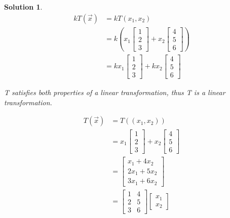 \documentclass{article}
\newtheorem*{solution}{Solution}
\begin{document}
\begin{solution}
\begin{align*}
kT(\vec{x}) &= kT(x_{1}, x_{2}) \\
&= k\left(x_{1} \begin{bmatrix} 1 \\ 2 \\ 3 \end{bmatrix} + x_{2} \begin{bmatrix} 4 \\ 5 \\ 6 \end{bmatrix} \right) \\
&= kx_{1} \begin{bmatrix} 1 \\ 2 \\ 3 \end{bmatrix} + kx_{2} \begin{bmatrix} 4 \\ 5 \\ 6 \end{bmatrix} 
\end{align*}

T satisfies both properties of a linear transformation, thus T is a linear transformation.

\begin{align*}
T(\vec{x}) &= T((x_{1}, x_{2})) \\
&= x_{1} \begin{bmatrix}1 \\ 2 \\ 3 \end{bmatrix} + x_{2} \begin{bmatrix}4 \\ 5 \\ 6 \end{bmatrix} \\
&= \begin{bmatrix} x_{1} + 4x_{2} \\ 2x_{1} + 5x_{2} \\ 3x_{1} + 6x_{2} \end{bmatrix} \\
&= \begin{bmatrix} 1 & 4 \\ 2 & 5 \\ 3 & 6 \end{bmatrix} \begin{bmatrix} x_{1} \\ x_{2} \end{bmatrix} 
\end{align*}


\end{solution}
\end{document}
